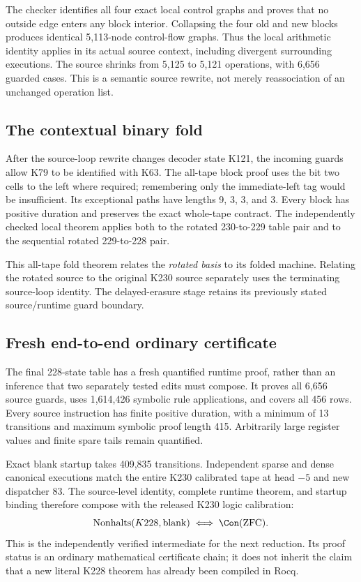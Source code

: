 The checker identifies all four exact local control graphs and proves that no
outside edge enters any block interior. Collapsing the four old and new blocks
produces identical 5,113-node control-flow graphs. Thus the local arithmetic
identity applies in its actual source context, including divergent surrounding
executions. The source shrinks from 5,125 to 5,121 operations, with 6,656 guarded
cases. This is a semantic source rewrite, not merely reassociation of an
unchanged operation list.

\subsection{The contextual binary fold}
After the source-loop rewrite changes decoder state K121, the incoming guards
allow K79 to be identified with K63. The all-tape block proof uses the bit two
cells to the left where required; remembering only the immediate-left tag
would be insufficient. Its exceptional paths have lengths 9, 3, 3, and 3.
Every block has positive duration and preserves the exact whole-tape contract.
The independently checked local theorem applies both to the rotated
230-to-229 table pair and to the sequential rotated 229-to-228 pair.

This all-tape fold theorem relates the \emph{rotated basis} to its folded
machine. Relating the rotated source to the original K230 source separately
uses the terminating source-loop identity. The delayed-erasure stage retains
its previously stated source/runtime guard boundary.

\subsection{Fresh end-to-end ordinary certificate}
The final 228-state table has a fresh quantified runtime proof, rather than an
inference that two separately tested edits must compose. It proves all 6,656
source guards, uses 1,614,426 symbolic rule applications, and covers all 456
rows. Every source instruction has finite positive duration, with a minimum
of 13 transitions and maximum symbolic proof length 415. Arbitrarily large
register values and finite spare tails remain quantified.

Exact blank startup takes 409,835 transitions. Independent sparse and dense
canonical executions match the entire K230 calibrated tape at head $-5$ and
new dispatcher 83. The source-level identity, complete runtime theorem, and
startup binding therefore compose with the released K230 logic calibration:
\[
 \operatorname{Nonhalts}(K228,\mathrm{blank})\iff\Con(\mathrm{ZFC}).
\]
This is the independently verified intermediate for the next reduction. Its proof status is an
ordinary mathematical certificate chain; it does not inherit the claim that
a new literal K228 theorem has already been compiled in Rocq.
